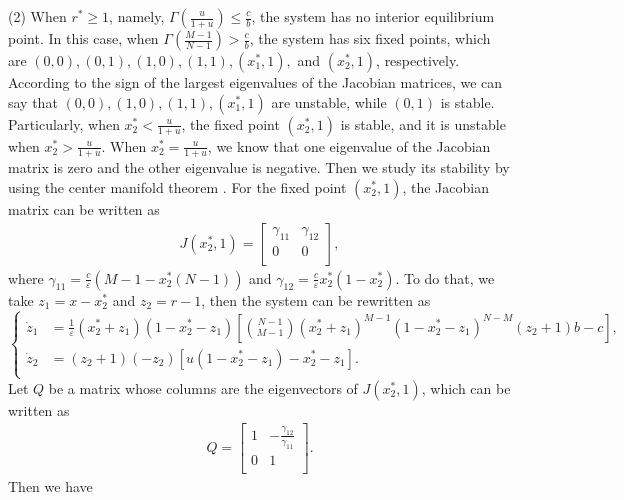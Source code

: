 \documentclass[9pt]{elife}
\begin{document}
\begin{appendixbox}
(2) When $r^{*}\geq1$, namely, $\Gamma(\frac{u}{1+u})\leq\frac{c}{b}$, the system has no interior equilibrium point. In this case, when $\Gamma(\frac{M-1}{N-1})>\frac{c}{b}$, the system has six fixed points, which are $(0, 0), (0, 1), (1, 0), (1, 1), (x_{1}^{*},1),$ and $(x_{2}^{*}, 1)$, respectively. According to the sign of the largest eigenvalues of the Jacobian matrices, we can say that $(0, 0), (1, 0), (1, 1), (x_{1}^{*}, 1)$ are unstable, while $(0, 1)$ is stable. Particularly, when $x_{2}^{*}<\frac{u}{1+u}$, the fixed point $(x_{2}^{*}, 1)$ is stable, and it is unstable when $x_{2}^{*}>\frac{u}{1+u}$. When $x_{2}^{*}=\frac{u}{1+u}$, we know that one eigenvalue of the Jacobian matrix is zero and the other eigenvalue is negative. Then we study its stability by using the center manifold theorem \citep{KhalilHK1996}. For the fixed point $(x_{2}^{*}, 1)$, the Jacobian matrix can be written as
\begin{eqnarray*}
J(x_{2}^{*}, 1) =
  \left[ {\begin{array}{cc}
    \gamma_{11} & \gamma_{12} \\
    0 & 0 \\
  \end{array} } \right],
\end{eqnarray*}
where $\gamma_{11}=\frac{c}{\varepsilon}(M-1-x_{2}^{*}(N-1))$ and $\gamma_{12}=\frac{c}{\varepsilon}x_{2}^{*}(1-x_{2}^{*})$. To do that, we take $z_{1}=x-x_{2}^{*}$ and $z_{2}=r-1$, then the system can be rewritten as
\begin{equation*}
\left\{
\begin{aligned}
\dot{z}_{1}&=\frac{1}{\varepsilon}(x_{2}^{*}+z_{1})(1-x_{2}^{*}-z_{1})[\binom{N-1}{M-1}(x_{2}^{*}+z_{1})^{M-1}(1-x_{2}^{*}-z_{1})^{N-M}(z_{2}+1)b-c],\\
\dot{z}_{2}&=(z_{2}+1)(-z_{2})[u(1-x_{2}^{*}-z_{1})-x_{2}^{*}-z_{1}].\\
\end{aligned}
\right.
\end{equation*}
Let $Q$ be a matrix whose columns are the eigenvectors of $J(x_{2}^{*}, 1)$, which can be written as
\begin{eqnarray*}
Q =
  \left[ {\begin{array}{cc}
    1 & -\frac{\gamma_{12}}{\gamma_{11}} \\
    0 & 1 \\
  \end{array} } \right].
\end{eqnarray*}
Then we have
\begin{eqnarray*}

\end{eqnarray*}
\end{appendixbox}
\end{document}

